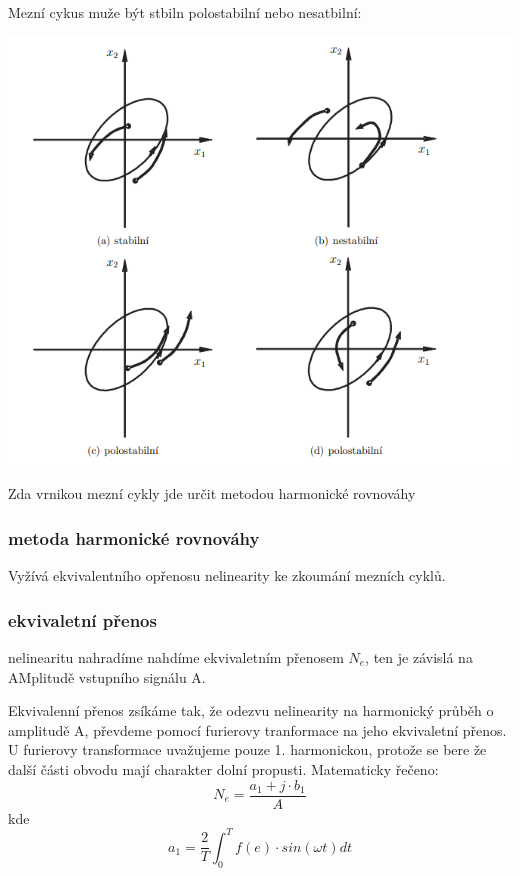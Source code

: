 Mezní cykus muže být stbiln polostabilní nebo nesatbilní:  


\includegraphics{img/mez_cykly.png}


Zda vrnikou mezní cykly jde určit metodou harmonické rovnováhy
\subsubsection*{metoda harmonické rovnováhy}
Vyžívá ekvivalentního opřenosu nelinearity ke zkoumání mezních cyklů.

\subsubsection*{ekvivaletní přenos}
nelinearitu nahradíme nahdíme ekvivaletním přenosem $N_e$, ten je závislá na AMplitudě vstupního signálu A.

Ekvivalenní přenos zsíkáme  tak, že odezvu nelinearity na harmonický průběh o amplitudě A, převdeme pomocí furierovy tranformace na jeho ekvivaletní přenos. U furierovy transformace uvažujeme pouze 1. harmonickou, 
protože se bere že další části obvodu mají charakter dolní propusti. Matematicky řečeno:
\begin{equation*}
    N_e= \frac{a_1+j\cdot b_1}{A}
\end{equation*}
kde
\begin{equation*}
    a_1=\frac{2}{T} \int_{0}^{T} f(e) \cdot sin(\omega t) dt
\end{equation*}

